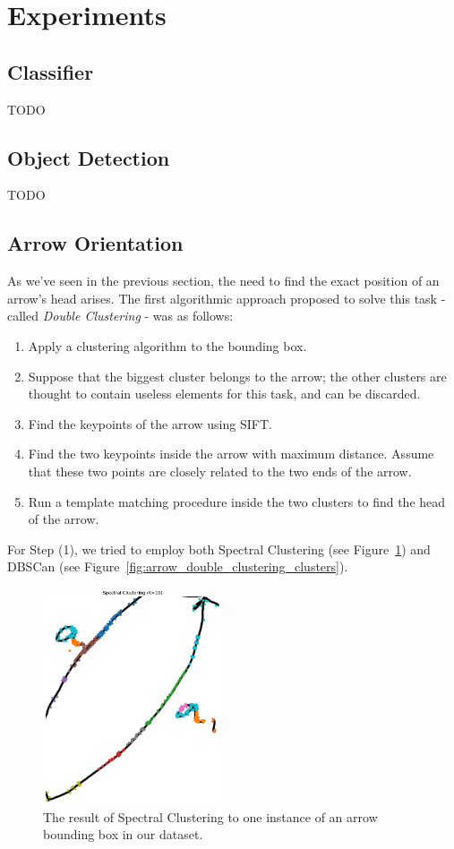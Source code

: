 \documentclass[conference]{IEEEtran}
\begin{document}
\section{Experiments}

\subsection{Classifier}
TODO

\subsection{Object Detection}
TODO

\subsection{Arrow Orientation}
As we've seen in the previous section, the need to find the exact position of an arrow's head arises.
The first algorithmic approach proposed to solve this task - called \textit{Double Clustering} - was as follows: 
\begin{enumerate}
	\item Apply a clustering algorithm to the bounding box.
	\item Suppose that the biggest cluster belongs to the arrow; the other clusters are thought to contain useless elements for this task, and can be discarded.
	\item Find the keypoints of the arrow using SIFT.
	\item Find the two keypoints inside the arrow with maximum distance. Assume that these two points are closely related to the two ends of the arrow.
	\item Run a template matching procedure inside the two clusters to find the head of the arrow.
\end{enumerate}

For Step (1), we tried to employ both Spectral Clustering (see Figure~\ref{fig:spectral_clustering}) and DBSCan (see Figure~\ref{fig:arrow_double_clustering_clusters}).

\begin{figure}[H]
\centering
\includegraphics[width=150pt]{spectral_clustering.png}
\caption{The result of Spectral Clustering to one instance of an arrow bounding box in our dataset.}
\label{fig:spectral_clustering}
\end{figure}
\end{document}
